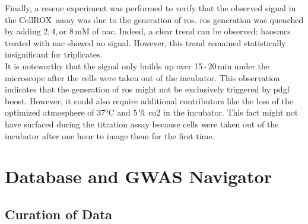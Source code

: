 Finally, a rescue experiment was performed to verify that the observed signal in the CellROX\texttrademark~assay was due to the generation of \ac{ros}. \ac{ros} generation was quenched by adding 2,\,4,\,or 8\,mM of \ac{nac}. Indeed, a clear trend can be observed: \acp{haosmc} treated with \ac{nac} showed no signal. However, this trend remained statistically insignificant for triplicates.\\
It is noteworthy that the signal only builds up over 15\,-\,20\,min under the microscope after the cells were taken out of the incubator. This observation indicates that the generation of \ac{ros} might not be exclusively triggered by \ac{pdgf} boost. However, it could also require additional contributors like the loss of the optimized atmosphere of 37°C and 5\,\% \ac{co2} in the incubator. This fact might not have surfaced during the titration assay because cells were taken out of the incubator after one hour to image them for the first time.

\section{Database and GWAS Navigator}

    \subsection{Curation of Data}

